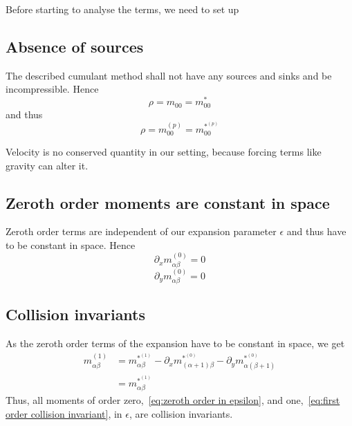 
Before starting to analyse the terms, we need to set up
\subsection{Absence of sources}
\label{sub:Absence of sources}
The described cumulant method shall not have any sources and sinks and be incompressible. Hence
\begin{equation}
    \rho  = m_{00} = m_{00}^*
\end{equation}
and thus
\begin{equation}
    \rho = m_{00}^{(p)} = m_{00}^{*^{(p)}}
\end{equation}

Velocity is no conserved quantity in our setting, because forcing terms like gravity can alter it.

\subsection{Zeroth order moments are constant in space}
\label{sub:Zeroth order moments are constant in space}
Zeroth order terms are independent of our expansion parameter $\epsilon$ and thus have to be constant in space. Hence
\begin{equation}
  \partial_x m_{\alpha\beta}^{(0)} = 0
\end{equation}
\begin{equation}
  \partial_y m_{\alpha\beta}^{(0)} = 0
\end{equation}


\subsection{Collision invariants}
\label{sub:Collision invariants}
As the zeroth order terms of the expansion have to be constant in space, we get
\begin{equation}
  \label{eq:first order collision invariant}
  \begin{aligned}
    m_{\alpha\beta}^{(1)}
    & = m_{\alpha\beta}^{*^{(1)}}
    - \partial_x m_{(\alpha+1)\beta}^{*^{(0)}}
    - \partial_y m_{\alpha(\beta+1)}^{*^{(0)}} \\
    & = m_{\alpha\beta}^{*^{(1)}}
  \end{aligned}
\end{equation}
Thus, all moments of order zero,~\eqref{eq:zeroth order in epsilon},
and one,~\eqref{eq:first order collision invariant}, in $\epsilon$, are collision invariants.

